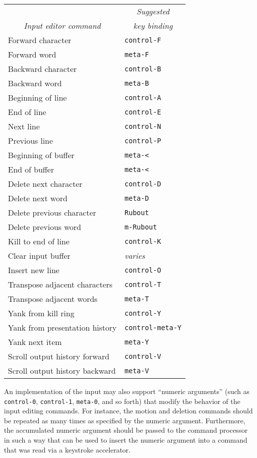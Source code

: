 \begin{tabular}{|l|l|}
\hline
\multicolumn{1}{c}{}                         & \multicolumn{1}{c}{\sl Suggested}   \\ 
\multicolumn{1}{c}{\sl Input editor command} & \multicolumn{1}{c}{\sl key binding} \\
\hline
Forward character   & {\tt control-F} \\
Forward word        & {\tt meta-F}    \\
Backward character  & {\tt control-B} \\
Backward word       & {\tt meta-B}    \\
Beginning of line   & {\tt control-A} \\
End of line         & {\tt control-E} \\
Next line           & {\tt control-N} \\
Previous line       & {\tt control-P} \\
Beginning of buffer & {\tt meta-<}    \\
End of buffer       & {\tt meta-<}    \\
Delete next character     & {\tt control-D} \\
Delete next word          & {\tt meta-D}    \\
Delete previous character & {\tt Rubout}    \\
Delete previous word      & {\tt m-Rubout}  \\
Kill to end of line       & {\tt control-K} \\
Clear input buffer        & {\sl varies}    \\
Insert new line           & {\tt control-O} \\
Transpose adjacent characters  & {\tt control-T}  \\
Transpose adjacent words       & {\tt meta-T}     \\
Yank from kill ring            & {\tt control-Y}  \\
Yank from presentation history & {\tt control-meta-Y} \\
Yank next item                 & {\tt meta-Y}     \\
Scroll output history forward   & {\tt control-V} \\
Scroll output history backward  & {\tt meta-V}    \\
\hline
\end{tabular}

An implementation of the input may also support ``numeric arguments'' (such as
{\tt control-0}, {\tt control-1}, {\tt meta-0}, and so forth) that modify the
behavior of the input editing commands.  For instance, the motion and deletion
commands should be repeated as many times as specified by the numeric argument.
Furthermore, the accumulated numeric argument should be passed to the command
processor in such a way that  can be used
to insert the numeric argument into a command that was read via a keystroke
accelerator.

